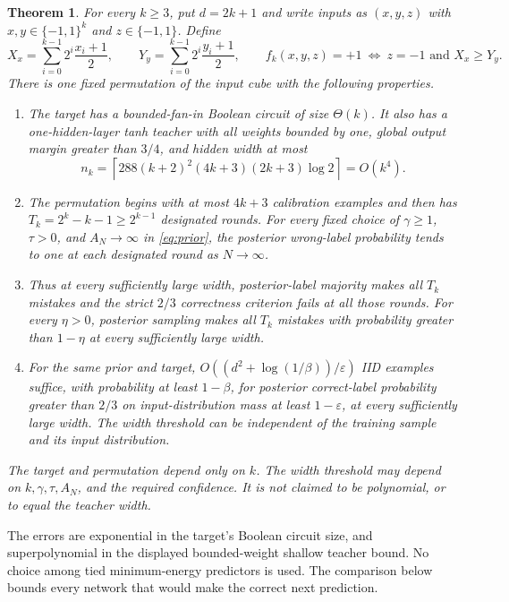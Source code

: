 \documentclass[11pt]{article}
\newtheorem{theorem}{Theorem}
\begin{document}
\begin{theorem}\label{thm:main}
For every $k\ge3$, put $d=2k+1$ and write inputs as $(x,y,z)$ with
$x,y\in\{-1,1\}^k$ and $z\in\{-1,1\}$. Define
\[
 X_x=\sum_{i=0}^{k-1}2^i\frac{x_i+1}{2},\qquad
 Y_y=\sum_{i=0}^{k-1}2^i\frac{y_i+1}{2},
 \qquad
 f_k(x,y,z)=+1\ \Longleftrightarrow\ z=-1\text{ and }X_x\ge Y_y.
\]
There is one fixed permutation of the input cube with the following
properties.
\begin{enumerate}
\item The target has a bounded-fan-in Boolean circuit of size $\Theta(k)$.
It also has a one-hidden-layer tanh teacher with all weights bounded by
one, global output margin greater than $3/4$, and hidden width at most
\[
 n_k=\left\lceil288(k+2)^2(4k+3)(2k+3)\log2\right\rceil=O(k^4).
\]
\item The permutation begins with at most $4k+3$ calibration examples
and then has $T_k=2^k-k-1\ge2^{k-1}$ designated rounds. For every fixed
choice of $\gamma\ge1$, $\tau>0$, and $A_N\to\infty$ in
\eqref{eq:prior}, the posterior wrong-label probability tends to one
at each designated round as $N\to\infty$.
\item Thus at every sufficiently large width, posterior-label majority
makes all $T_k$ mistakes and the strict $2/3$ correctness criterion fails
at all those rounds. For every $\eta>0$, posterior sampling makes all
$T_k$ mistakes with probability greater than $1-\eta$ at every
sufficiently large width.
\item For the same prior and target,
$O((d^2+\log(1/\beta))/\varepsilon)$ IID examples suffice, with
probability at least $1-\beta$, for posterior correct-label probability
greater than $2/3$ on input-distribution mass at least $1-\varepsilon$,
at every sufficiently large width. The width threshold can be independent
of the training sample and its input distribution.
\end{enumerate}
The target and permutation depend only on $k$. The width threshold may
depend on $k,\gamma,\tau,A_N$, and the required confidence. It is not
claimed to be polynomial, or to equal the teacher width.
\end{theorem}

The errors are exponential in the target's Boolean circuit size, and
superpolynomial in the displayed bounded-weight shallow teacher bound.
No choice among tied minimum-energy predictors is used. The comparison
below bounds every network that would make the correct next prediction.





\end{document}
